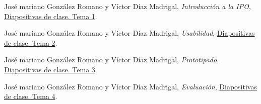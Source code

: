 \documentclass[a4paper,11pt]{article}
\begin{document}
\begin{thebibliography}{99}
  José mariano González Romano y Víctor Díaz Madrigal,
  \textit{Introducción a la IPO},
  \href{https://s3-eu-central-1.amazonaws.com/learn-eu-central-1-prod-fleet01-xythos/5ac734ed505df/1497177?response-content-disposition=inline%3B%20filename%2A%3DUTF-8%27%27IPO-2018-19-01-Introducci%25C3%25B3n%2520a%2520la%2520IPO.pdf&response-content-type=application%2Fpdf&X-Amz-Algorithm=AWS4-HMAC-SHA256&X-Amz-Date=20181009T201303Z&X-Amz-SignedHeaders=host&X-Amz-Expires=21600&X-Amz-Credential=AKIAIZ3QX2YUHH4EOO3A%2F20181009%2Feu-central-1%2Fs3%2Faws4_request&X-Amz-Signature=91e59768c9f86b77180953691bdcae19f7300073d4ad74d0949de1515d0b6f55}{Diapositivas de clase. Tema 1}.

    José mariano González Romano y Víctor Díaz Madrigal,
    \textit{Usabilidad},
    \href{https://s3-eu-central-1.amazonaws.com/learn-eu-central-1-prod-fleet01-xythos/5ac734ed505df/1548262?response-content-disposition=inline%3B%20filename%2A%3DUTF-8%27%27IPO-2018-19-02-Usabilidad.pdf&response-content-type=application%2Fpdf&X-Amz-Algorithm=AWS4-HMAC-SHA256&X-Amz-Date=20181108T092002Z&X-Amz-SignedHeaders=host&X-Amz-Expires=21600&X-Amz-Credential=AKIAIZ3QX2YUHH4EOO3A%2F20181108%2Feu-central-1%2Fs3%2Faws4_request&X-Amz-Signature=b6f88f86fcc8fc9e65cb7762b151621c9d17779d12ea366fa9e6cf74db65f16f}{Diapositivas de clase. Tema 2}.

  José mariano González Romano y Víctor Díaz Madrigal,
  \textit{Prototipado},
  \href{https://s3-eu-central-1.amazonaws.com/learn-eu-central-1-prod-fleet01-xythos/5ac734ed505df/1717656?response-content-disposition=inline%3B%20filename%2A%3DUTF-8%27%27IPO-2018-19-03-Prototipado.pdf&response-content-type=application%2Fpdf&X-Amz-Algorithm=AWS4-HMAC-SHA256&X-Amz-Date=20181108T092046Z&X-Amz-SignedHeaders=host&X-Amz-Expires=21600&X-Amz-Credential=AKIAIZ3QX2YUHH4EOO3A%2F20181108%2Feu-central-1%2Fs3%2Faws4_request&X-Amz-Signature=a298d276e4c75007b2970ddc1e4aa7fa8c92e35d85e8ed270504f153329534cb}{Diapositivas de clase. Tema 3}.

  José mariano González Romano y Víctor Díaz Madrigal,
  \textit{Evaluación},
  \href{https://s3-eu-central-1.amazonaws.com/learn-eu-central-1-prod-fleet01-xythos/5ac734ed505df/1868140?response-content-disposition=inline%3B%20filename%2A%3DUTF-8%27%27IPO-2018-19-04-Evaluaci%25C3%25B3n.pdf&response-content-type=application%2Fpdf&X-Amz-Algorithm=AWS4-HMAC-SHA256&X-Amz-Date=20181108T092127Z&X-Amz-SignedHeaders=host&X-Amz-Expires=21600&X-Amz-Credential=AKIAIZ3QX2YUHH4EOO3A%2F20181108%2Feu-central-1%2Fs3%2Faws4_request&X-Amz-Signature=df3ee954b039d2239e0947995469951f22d0bd91826341575b083d05e3865ccc}{Diapositivas de clase. Tema 4}.



\end{thebibliography}
\end{document}
